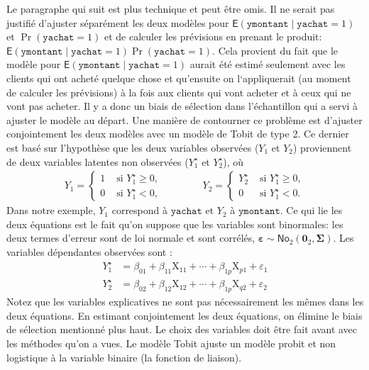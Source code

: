 \documentclass[
  11pt,
  letterpaper,
]{scrbook}
\theoremstyle{definition}
\theoremstyle{remark}
\begin{document}
Le paragraphe qui suit est plus technique et peut être omis. Il ne
serait pas justifié d'ajuster séparément les deux modèles pour
\(\mathsf{E}(\texttt{ymontant} \mid \texttt{yachat}=1)\) et
\(\Pr(\texttt{yachat}=1)\) et de calculer les prévisions en prenant le
produit:
\(\mathsf{E}(\texttt{ymontant} \mid \texttt{yachat}=1)\Pr(\texttt{yachat}=1)\).
Cela provient du fait que le modèle pour
\(\mathsf{E}(\texttt{ymontant} \mid \texttt{yachat}=1)\) aurait été
estimé seulement avec les clients qui ont acheté quelque chose et
qu'ensuite on l`appliquerait (au moment de calculer les prévisions) à la
fois aux clients qui vont acheter et à ceux qui ne vont pas acheter. Il
y a donc un biais de sélection dans l'échantillon qui a servi à ajuster
le modèle au départ. Une manière de contourner ce problème est d'ajuster
conjointement les deux modèles avec un modèle de Tobit de type 2. Ce
dernier est basé sur l'hypothèse que les deux variables observées
(\(Y_1\) et \(Y_2\)) proviennent de deux variables latentes non
observées (\(Y_1^{\star}\) et \(Y_2^{\star}\)), où \begin{align*}
Y_1 = \begin{cases}
1 & \text{ si } Y_1^{\star} \ge 0, \\
0 & \text{ si } Y_1^{\star} < 0,
\end{cases}
\qquad \qquad 
Y_2 = \begin{cases}
Y_2^{\star} & \text{ si } Y_1^{\star} \ge 0, \\
0 & \text{ si } Y_1^{\star} < 0.
\end{cases}
\end{align*} Dans notre exemple, \(Y_1\) correspond à
\(\texttt{yachat}\) et \(Y_2\) à \(\texttt{ymontant}\). Ce qui lie les
deux équations est le fait qu'on suppose que les variables sont
binormales: les deux termes d'erreur sont de loi normale et sont
corrélés,
\(\boldsymbol{\varepsilon} \sim \mathsf{No}_2(\boldsymbol{0}_2, \boldsymbol{\Sigma})\).
Les variables dépendantes observées sont : \begin{align*}
Y_{1}^{\star} &= \beta_{01} + \beta_{11} \mathrm{X}_{11} + \cdots + \beta_{1p}\mathrm{X}_{p1} + \varepsilon_{1}\\
Y_{2}^{\star} &= \beta_{02} + \beta_{12} \mathrm{X}_{12} + \cdots + \beta_{1p}\mathrm{X}_{q2} + \varepsilon_{2}
\end{align*} Notez que les variables explicatives ne sont pas
nécessairement les mêmes dans les deux équations. En estimant
conjointement les deux équations, on élimine le biais de sélection
mentionné plus haut. Le choix des variables doit être fait avant avec
les méthodes qu'on a vues. Le modèle Tobit ajuste un modèle probit et
non logistique à la variable binaire (la fonction de liaison).
\end{document}

